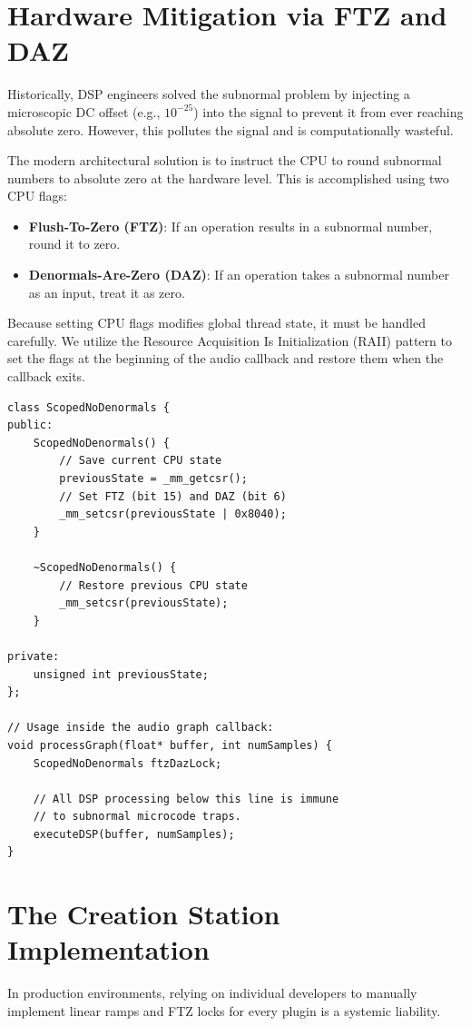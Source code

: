\documentclass[11pt,a4paper]{article}
\begin{document}
\section{Hardware Mitigation via FTZ and DAZ}
Historically, DSP engineers solved the subnormal problem by injecting a microscopic DC offset (e.g., $10^{-25}$) into the signal to prevent it from ever reaching absolute zero. However, this pollutes the signal and is computationally wasteful.

The modern architectural solution is to instruct the CPU to round subnormal numbers to absolute zero at the hardware level. This is accomplished using two CPU flags:
\begin{itemize}
    \item \textbf{Flush-To-Zero (FTZ)}: If an operation results in a subnormal number, round it to zero.
    \item \textbf{Denormals-Are-Zero (DAZ)}: If an operation takes a subnormal number as an input, treat it as zero.
\end{itemize}

Because setting CPU flags modifies global thread state, it must be handled carefully. We utilize the Resource Acquisition Is Initialization (RAII) pattern to set the flags at the beginning of the audio callback and restore them when the callback exits.

\begin{verbatim}
class ScopedNoDenormals {
public:
    ScopedNoDenormals() {
        // Save current CPU state
        previousState = _mm_getcsr();
        // Set FTZ (bit 15) and DAZ (bit 6)
        _mm_setcsr(previousState | 0x8040); 
    }

    ~ScopedNoDenormals() {
        // Restore previous CPU state
        _mm_setcsr(previousState);
    }

private:
    unsigned int previousState;
};

// Usage inside the audio graph callback:
void processGraph(float* buffer, int numSamples) {
    ScopedNoDenormals ftzDazLock; 
    
    // All DSP processing below this line is immune 
    // to subnormal microcode traps.
    executeDSP(buffer, numSamples);
}
\end{verbatim}

\section{The Creation Station Implementation}
In production environments, relying on individual developers to manually implement linear ramps and FTZ locks for every plugin is a systemic liability. 
\end{document}
